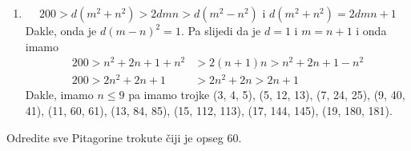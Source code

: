 \documentclass{exam}
\begin{document}
\begin{questions}
\begin{solution}
\begin{enumerate}
    \item
      \[
        200 > d(m^2+n^2) > 2dmn > d(m^2-n^2) \text{ i } d(m^2+n^2) = 2dmn + 1
      \]
      Dakle, onda je $d(m - n)^2 = 1$. Pa slijedi da je $d = 1$ i $m = n + 1$ i onda imamo
      \begin{align*}
        200 > n^2+2n+1+n^2 &> 2(n+1)n > n^2+2n+1-n^2\\
        200 > 2n^2+2n+1 &> 2n^2+2n > 2n + 1
      \end{align*}
      Dakle, imamo $n \leq 9$ pa imamo trojke (3, 4, 5), (5, 12, 13), (7, 24, 25), (9, 40, 41), (11, 60, 61), (13, 84, 85), (15, 112, 113), (17, 144, 145), (19, 180, 181).
  \end{enumerate}
\end{solution}

\question Odredite sve Pitagorine trokute čiji je opseg 60.


\end{questions}
\end{document}
